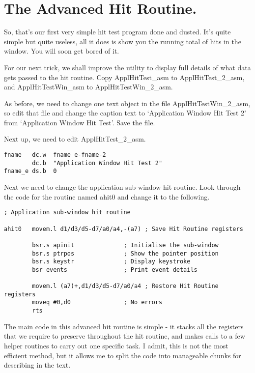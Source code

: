 \section{The Advanced Hit Routine.}
\label{ch28-appl-adv-hit}%

So, that's our first very simple hit test program done and dusted. It's
        quite simple but quite useless, all it does is show you the running total of hits
        in the window. You will soon get bored of it.

For our next trick, we shall improve the utility to display full details of
        what data gets passed to the hit routine. Copy
 ApplHitTest\_asm to ApplHitTest\_2\_asm,
        and ApplHitTestWin\_asm to
 ApplHitTestWin\_2\_asm.

As before, we need to change one text object in the file
 ApplHitTestWin\_2\_asm, so edit that file and change the
        caption text to `Application Window Hit Test 2' from `Application Window Hit Test'.
        Save the file.

Next up, we need to edit ApplHitTest\_2\_asm.

\begin{lstlisting}[firstnumber=1,]
fname   dc.w  fname_e-fname-2
        dc.b  "Application Window Hit Test 2"
fname_e ds.b  0
\end{lstlisting}

Next we need to change the application sub-{}window hit routine. Look through
        the code for the routine named ahit0 and change it to the following.

\begin{lstlisting}[firstnumber=1,]
; Application sub-window hit routine

ahit0   movem.l d1/d3/d5-d7/a0/a4,-(a7) ; Save Hit Routine registers

        bsr.s apinit              ; Initialise the sub-window
        bsr.s ptrpos              ; Show the pointer position
        bsr.s keystr              ; Display keystroke
        bsr events                ; Print event details

        movem.l (a7)+,d1/d3/d5-d7/a0/a4 ; Restore Hit Routine registers
        moveq #0,d0               ; No errors
        rts
\end{lstlisting}

The main code in this advanced hit routine is simple -{} it stacks all the
        registers that we require to preserve throughout the hit routine, and makes calls
        to a few helper routines to carry out one specific task. I admit, this is not the
        most efficient method, but it allows me to split the code into manageable chunks
        for describing in the text.
        
